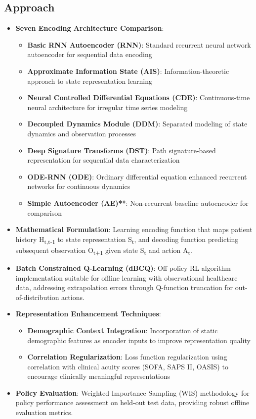 \subsection*{Approach}
\begin{itemize}
    \item \textbf{Seven Encoding Architecture Comparison}:
    \begin{itemize}
        \item \textbf{Basic RNN Autoencoder (RNN)}: Standard recurrent neural network autoencoder for sequential data encoding
        \item \textbf{Approximate Information State (AIS)}: Information-theoretic approach to state representation learning
        \item \textbf{Neural Controlled Differential Equations (CDE)}: Continuous-time neural architecture for irregular time series modeling
        \item \textbf{Decoupled Dynamics Module (DDM)}: Separated modeling of state dynamics and observation processes
        \item \textbf{Deep Signature Transforms (DST)}: Path signature-based representation for sequential data characterization
        \item \textbf{ODE-RNN (ODE)}: Ordinary differential equation enhanced recurrent networks for continuous dynamics
        \item \textbf{Simple Autoencoder (AE)*}*: Non-recurrent baseline autoencoder for comparison
    \end{itemize}
    \item \textbf{Mathematical Formulation}: Learning encoding function that maps patient history H\textsubscript{t,t-1} to state representation S\textsubscript{t}, and decoding function predicting subsequent observation O\textsubscript{t+1} given state S\textsubscript{t} and action A\textsubscript{t}.
    \item \textbf{Batch Constrained Q-Learning (dBCQ)}: Off-policy RL algorithm implementation suitable for offline learning with observational healthcare data, addressing extrapolation errors through Q-function truncation for out-of-distribution actions.
    \item \textbf{Representation Enhancement Techniques}:
    \begin{itemize}
        \item \textbf{Demographic Context Integration}: Incorporation of static demographic features as encoder inputs to improve representation quality
        \item \textbf{Correlation Regularization}: Loss function regularization using correlation with clinical acuity scores (SOFA, SAPS II, OASIS) to encourage clinically meaningful representations
    \end{itemize}
    \item \textbf{Policy Evaluation}: Weighted Importance Sampling (WIS) methodology for policy performance assessment on held-out test data, providing robust offline evaluation metrics.
\end{itemize}


